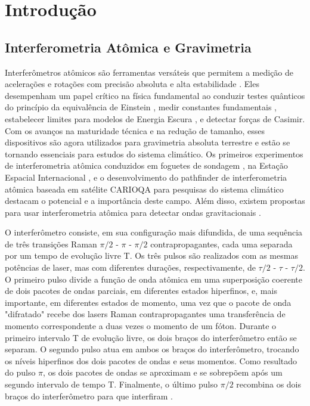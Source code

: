 \section{Introdução}
\subsection{Interferometria Atômica e Gravimetria}

Interferômetros atômicos são ferramentas versáteis que permitem a medição de acelerações e rotações com precisão absoluta e alta estabilidade \cite{geiger2020highaccuracy}. Eles desempenham um papel crítico na física fundamental ao conduzir testes quânticos do princípio da equivalência de Einstein \cite{asenbaum2020atom}, medir constantes fundamentais \cite{rosi2014precision}\cite{morel2020determination}, estabelecer limites para modelos de Energia Escura \cite{elder2016chameleon}, e detectar forças de Casimir. Com os avanços na maturidade técnica e na redução de tamanho, esses dispositivos são agora utilizados para gravimetria absoluta terrestre \cite{menoret2018gravity} e estão se tornando essenciais para estudos do sistema climático. Os primeiros experimentos de interferometria atômica conduzidos em foguetes de sondagem \cite{becker2018space}, na Estação Espacial Internacional \cite{aveline2020observation}, e o desenvolvimento do pathfinder de interferometria atômica baseada em satélite CARIOQA \cite{lévèque2022carioqa} para pesquisas do sistema climático destacam o potencial e a importância deste campo. Além disso, existem propostas para usar interferometria atômica para detectar ondas gravitacionais \cite{badurina2022prospective}.

O interferômetro consiste, em sua configuração mais difundida, de uma sequência de três transições Raman $\pi/2$ - $\pi$ - $\pi/2$ contrapropagantes, cada uma separada por um tempo de evolução livre T. Os três pulsos são realizados com as mesmas potências de laser, mas com diferentes durações, respectivamente, de $\tau/2$ - $\tau$ - $\tau/2$. O primeiro pulso divide a função de onda atômica em uma superposição coerente de dois pacotes de ondas parciais, em diferentes estados hiperfinos, e, mais importante, em diferentes estados de momento, uma vez que o pacote de onda "difratado" recebe dos lasers Raman contrapropagantes uma transferência de momento correspondente a duas vezes o momento de um fóton. Durante o primeiro intervalo T de evolução livre, os dois braços do interferômetro então se separam. O segundo pulso atua em ambos os braços do interferômetro, trocando os níveis hiperfinos dos dois pacotes de ondas e seus momentos. Como resultado do pulso $\pi$, os dois pacotes de ondas se aproximam e se sobrepõem após um segundo intervalo de tempo T. Finalmente, o último pulso $\pi/2$ recombina os dois braços do interferômetro para que interfiram \cite{cheinet2006conception}.

